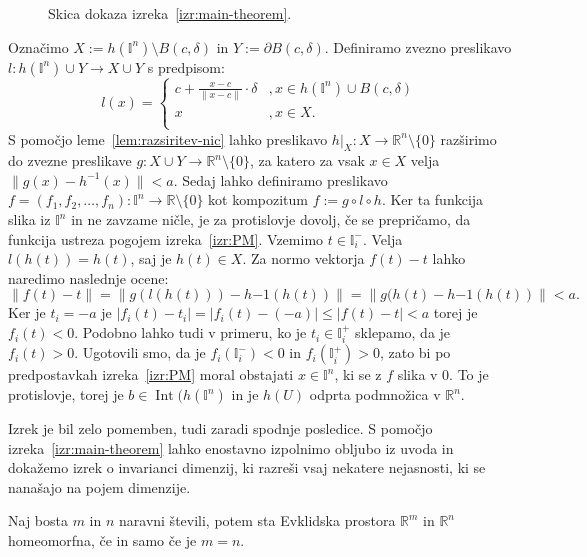 \documentclass[mat1]{fmfdelo}
\newcommand{\R}{\mathbb R}
\DeclareMathOperator{\Int}{Int}
\newcommand{\I}{\mathbb I}
\newcommand{\0}{\underline{0}}
\begin{document}
\begin{dokaz}
\begin{figure}[h!]
	\caption{Skica dokaza izreka~\ref{izr:main-theorem}.}
\end{figure}

Označimo $X := h(\I^n) \setminus B(c, \delta)$ in $Y := \partial B(c, \delta)$. Definiramo zvezno preslikavo $l : h(\I^n) \cup Y \to X \cup Y$ s predpisom:
\[  l(x) = \left\{
\begin{array}{ll}
	c + \frac{x - c}{\| x - c \|} \cdot \delta &, x \in h(\I^n) \cup B(c, \delta) \\
	x &, x \in X. \\
\end{array} 
\right. \]
S pomočjo leme~\ref{lem:razsiritev-nic} lahko preslikavo $h|_X : X \to \R^n \setminus \{ 0 \}$ razširimo do zvezne preslikave $g : X \cup Y \to \R^n \setminus \{ 0 \}$, za katero za vsak $x \in X$ velja $\| g(x) - h^{-1}(x) \| < a$.
Sedaj lahko definiramo preslikavo $f = (f_1, f_2, \dots, f_n) : \I^n \to \R \setminus \{ 0 \}$ kot kompozitum $f := g \circ l \circ h$. Ker ta funkcija slika iz $\I^n$ in ne zavzame ničle, je za protislovje dovolj, če se prepričamo, da funkcija ustreza pogojem izreka~\ref{izr:PM}. Vzemimo $t \in \I_i^-$. Velja $l(h(t)) = h(t)$, saj je $h(t) \in X$. Za normo vektorja $f(t) - t$ lahko naredimo naslednje ocene:
$$\| f(t) - t \| = \| g(l(h(t))) - h{-1}(h(t)) \| = \| g(h(t) - h{-1}(h(t)) \| < a.$$ 
Ker je $t_i = - a$ je $| f_i (t) - t_i | = | f_i (t) - ( - a) | \leq | f (t) - t | < a$ torej je $f_i(t) < 0$. Podobno lahko tudi v primeru, ko je $t_i \in \I_i^+$  sklepamo, da je $f_i(t) > 0$. Ugotovili smo, da je  $f_i(\I_i^-) < 0$ in $f_i(\I_i^+) > 0$, zato bi po predpostavkah izreka~\ref{izr:PM} moral obstajati $x \in \I^n$, ki se z $f$ slika v $0$. To je protislovje, torej je $b \in \Int (h(\I^n)$ in je $h(U)$ odprta podmnožica v $\R^n$.
\end{dokaz}
Izrek je bil zelo pomemben, tudi zaradi spodnje posledice.
S pomočjo izreka~\ref{izr:main-theorem} lahko enostavno izpolnimo obljubo iz uvoda in dokažemo izrek o invarianci dimenzij, ki razreši vsaj nekatere nejasnosti, ki se nanašajo na pojem dimenzije.
\begin{posledica}\label{izr:dim_izr}
Naj bosta $m$ in $n$ naravni števili, potem sta Evklidska prostora $\R^m$ in $\R^n$ homeomorfna, če in samo če je $m = n$.
\end{posledica}
\end{document}
